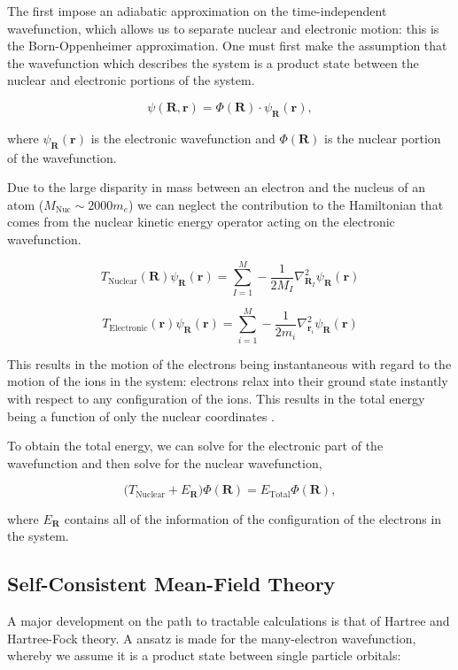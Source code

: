 \documentclass[a4paper,12pt,oneside,print,numbered,index,PageStyleIII]{PhDThesisPSnPDF}
\begin{document}
The first impose an adiabatic approximation on the time-independent wavefunction, which allows us to separate
nuclear and electronic motion: this is the Born-Oppenheimer approximation. One must first make the
assumption that the wavefunction which describes the system is a product state between the nuclear
and electronic portions of the system.

\[ \psi(\mathbf{R}, \mathbf{r}) = \Phi(\mathbf{R}) \cdot \psi_{\mathbf{R}}(\mathbf{r}), \]

where \(\psi_{\mathbf{R}}(\mathbf{r})\) is the electronic wavefunction and \(\Phi(\mathbf{R})\) is
the nuclear portion of the wavefunction.

Due to the large disparity in mass between an electron and the nucleus of an atom (\(M_\text{Nuc} \sim
 2000 m_e\)) we can neglect the contribution to the Hamiltonian that comes from the nuclear
kinetic energy operator acting on the electronic wavefunction.

\[T_{\text{Nuclear}}(\mathbf{R}) \psi_{\mathbf{R}}(\mathbf{r}) = \sum_{I =
 1}^{M} - \frac{1}{2M_{I}} \nabla^{2}_{\mathbf{R}_{I}} \psi_{\mathbf{R}}(\mathbf{r})\]


\[T_{\text{Electronic}}(\mathbf{r}) \psi_{\mathbf{R}}(\mathbf{r}) = \sum_{i =
 1}^{M} - \frac{1}{2m_{i}} \nabla^{2}_{\mathbf{r}_{i}}
 \psi_{\mathbf{R}}(\mathbf{r}) \]

This results in the motion of the electrons being instantaneous with regard to the
motion of the ions in the system: electrons relax into their ground state instantly with
respect to any configuration of the ions. This results in the total energy being a function of
only the nuclear coordinates \cite{Finnis1997}.

To obtain the total energy, we can solve for the electronic part of the wavefunction and then
solve for the nuclear wavefunction,

\[ \Big( T_{\text{Nuclear}} + E_{\mathbf{R}} \Big) \Phi(\mathbf{R}) = E_{\text{Total}} \Phi(\mathbf{R}),\]

where \(E_{\mathbf{R}}\) contains all of the information of the configuration of the electrons in
the system.


\subsection{Self-Consistent Mean-Field Theory}
\label{sec:org5472724}

A major development on the path to tractable calculations is that of Hartree and Hartree-Fock
theory. A ansatz is made for the many-electron wavefunction, whereby we assume it is a product
state between single particle orbitals:
\end{document}
